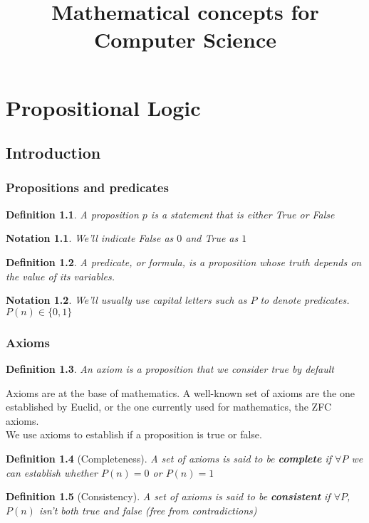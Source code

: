 \documentclass{report}
\title{Mathematical concepts for Computer Science}
\newtheorem{notation}{Notation}[section]
\newtheorem{definition}{Definition}[section]
\begin{document}
\maketitle
\tableofcontents
\chapter{Propositional Logic}
    \section{Introduction}
        \subsection{Propositions and predicates}
            \begin{definition}
                A proposition $p$ is a statement that is either True or False
            \end{definition}
            \begin{notation}
                We'll indicate False as $0$ and True as $1$
            \end{notation}
            \begin{definition}
                A predicate, or formula, is a proposition whose truth
                depends on the value of its variables. 
            \end{definition}
            \begin{notation}
                We'll usually use capital letters such as $P$ to denote predicates. \\
                $P\left(n\right) \in \{0, 1\}$
            \end{notation}
        \subsection{Axioms}
            \begin{definition}
                An axiom is a proposition that we consider true by default
            \end{definition}
            Axioms are at the base of mathematics. A well-known set of axioms are the one established by Euclid, or the one 
            currently used for mathematics, the ZFC axioms. \\
            We use axioms to establish if a proposition is true or false. \\
            \begin{definition}[Completeness]
                A set of axioms is said to be \textbf{complete} if $\forall P$ we can establish
                whether $P\left(n\right) = 0$ or $P\left(n\right) = 1$
            \end{definition}
            \begin{definition}[Consistency]
                A set of axioms is said to be \textbf{consistent} if $\forall P$, $P\left(n\right)$ 
                isn't both true and false (free from contradictions)
            \end{definition}
\end{document}

